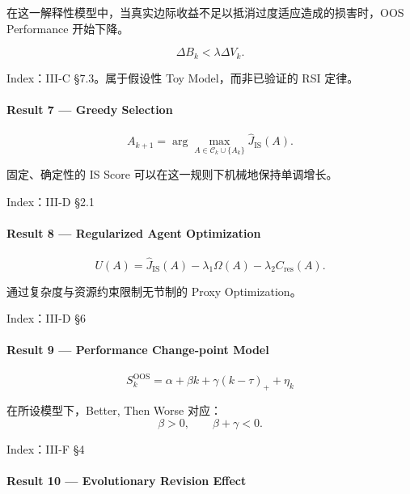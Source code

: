 在这一解释性模型中，当真实边际收益不足以抵消过度适应造成的损害时，OOS Performance 开始下降。

\[\Delta B_k<\lambda\Delta V_k.\]

Index：III-C §7.3。属于假设性 Toy Model，而非已验证的 RSI 定律。

\hypertarget{part-3-48-0001-result-7-greedy-selection}{%
\paragraph{Result 7 --- Greedy Selection}\label{part-3-48-0001-result-7-greedy-selection}}

\[A_{k+1}
=
\arg\max_{A\in\mathcal C_k\cup\{A_k\}}
\widehat J_{\mathrm{IS}}(A).\]

固定、确定性的 IS Score 可以在这一规则下机械地保持单调增长。

Index：III-D §2.1

\hypertarget{part-3-48-0001-result-8-regularized-agent-optimization}{%
\paragraph{Result 8 --- Regularized Agent Optimization}\label{part-3-48-0001-result-8-regularized-agent-optimization}}

\[U(A)
=
\widehat J_{\mathrm{IS}}(A)
-\lambda_1\Omega(A)
-\lambda_2C_{\mathrm{res}}(A).\]

通过复杂度与资源约束限制无节制的 Proxy Optimization。

Index：III-D §6

\hypertarget{part-3-48-0001-result-9-performance-change-point-model}{%
\paragraph{Result 9 --- Performance Change-point Model}\label{part-3-48-0001-result-9-performance-change-point-model}}

\[\boxed{
S_k^{\mathrm{OOS}}
=
\alpha+\beta k+\gamma(k-\tau)_++\eta_k
}\]

在所设模型下，Better, Then Worse 对应：
\[\beta>0,\qquad\beta+\gamma<0.\]

Index：III-F §4

\hypertarget{part-3-48-0001-result-10-evolutionary-revision-effect}{%
\paragraph{Result 10 --- Evolutionary Revision Effect}\label{part-3-48-0001-result-10-evolutionary-revision-effect}}

